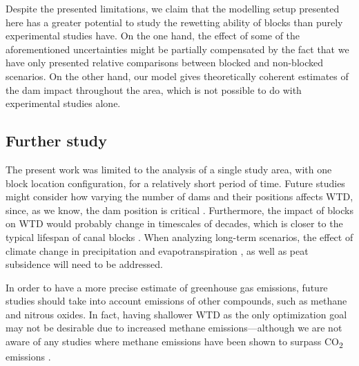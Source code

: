\documentclass[bg, manuscript]{copernicus}
\begin{document}

Despite the presented limitations, we claim that the modelling setup presented here has a greater potential to study the rewetting ability of blocks than purely experimental studies have.
On the one hand, the effect of some of the aforementioned uncertainties might be partially compensated by the fact that we have only presented relative comparisons between blocked and non-blocked scenarios.
On the other hand, our model gives theoretically coherent estimates of the dam impact throughout the area, which is not possible to do  with  experimental studies alone.

\subsection{Further study}
The present work was limited to the analysis of a single study area, with one block location configuration, for a relatively short period of time.
Future studies might consider how varying the number of dams and their positions affects WTD, since, as we know,  the dam position is critical \citep{urzainkiCanalBlockingOptimization2020}.
Furthermore, the impact of blocks on WTD would probably change in timescales of decades, which is closer to the typical lifespan of canal blocks \citep{ritzemaCanalBlockingStrategies2014, dohongReviewTechniquesEffective2018}.
When analyzing long-term scenarios, the effect of climate change in precipitation and evapotranspiration \citep{gallego-salaLatitudinalLimitsPredicted2018, wangPotentialShiftCarbon2018, caiIncreasingFrequencyExtreme2014, portnerClimateChange20222022}, as well as peat subsidence \citep{evansRatesSpatialVariability2019, hoytWidespreadSubsidenceCarbon2020, evansLongtermTrajectoryTemporal2022} will need to be addressed.

In order to have a more precise estimate of greenhouse gas emissions, future studies should take into account emissions of other compounds, such as methane and nitrous oxides.
In fact, having shallower WTD as the only optimization goal may not be desirable due to increased methane emissions---although we are not aware of any studies where methane emissions have been shown to surpass CO\textsubscript{2} emissions \citep{tehSeasonalVariabilityMethane2017, wongMicrometeorologicalMeasurementMethane2018, planas-clarkeEffectWaterTable2020, deshmukhImpactForestPlantation2020, deshmukhConservationSlowsEmission2021, kiuruPeatMacroporeNetworks2022, zouRewettingGlobalWetlands2022, lestariRewettingTropicalPeatlands2022}.
\end{document}
